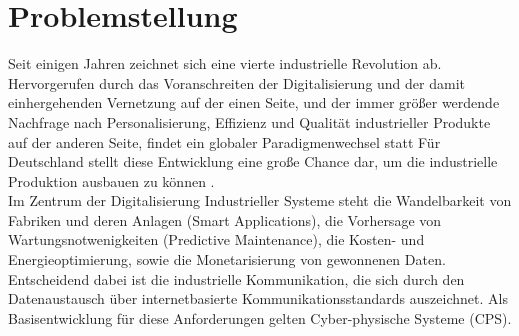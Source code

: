 \documentclass[12pt, a4paper, twoside]{article} %
\begin{document}
\section{Problemstellung}
Seit einigen Jahren zeichnet sich eine vierte industrielle Revolution ab. Hervorgerufen durch das Voranschreiten der Digitalisierung und der damit einhergehenden Vernetzung auf der einen Seite, und der immer größer werdende Nachfrage nach Personalisierung, Effizienz und Qualität industrieller Produkte auf der anderen Seite, findet ein globaler Paradigmenwechsel statt \cite[S. 33]{Bauernhansl2014} Für Deutschland stellt diese Entwicklung eine große Chance dar, um die industrielle Produktion ausbauen zu können \cite[S. 1]{Pistorius2020}.\\
Im Zentrum der Digitalisierung Industrieller Systeme steht die Wandelbarkeit von Fabriken und deren Anlagen (Smart Applications), die Vorhersage von Wartungsnotwenigkeiten (Predictive Maintenance), die Kosten- und Energieoptimierung, sowie die Monetarisierung von gewonnenen Daten. Entscheidend dabei ist die industrielle Kommunikation, die sich durch den Datenaustausch über internetbasierte Kommunikationsstandards auszeichnet. Als Basisentwicklung für diese Anforderungen gelten Cyber-physische Systeme (CPS).
\end{document}
